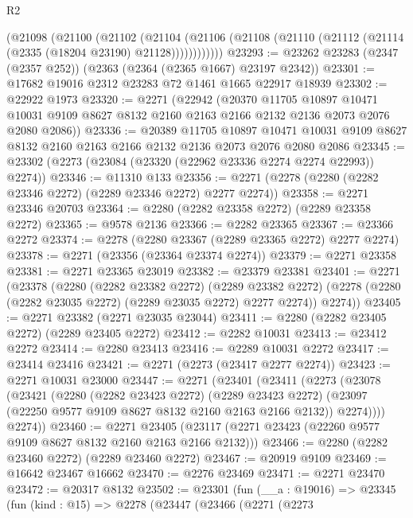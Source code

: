 \begin{lexlean}{R2}
\begin{coremodule}
        (@21098
          (@21100
            (@21102
              (@21104
                (@21106 (@21108 (@21110 (@21112 (@21114 (@2335 (@18204 @23190) @21128))))))))))))
@23293 := @23262 @23283 (@2347 (@2357 @252)) (@2363 (@2364 (@2365 @1667) @23197 @2342))
@23301 := @17682 @19016 @2312 @23283 @72 @1461 @1665 @22917 @18939
@23302 := @22922 @1973
@23320 := @2271
    (@22942
      (@20370
        @11705
        @10897
        @10471
        @10031
        @9109
        @8627
        @8132
        @2160
        @2163
        @2166
        @2132
        @2136
        @2073
        @2076
        @2080
        @2086))
@23336 := @20389
    @11705
    @10897
    @10471
    @10031
    @9109
    @8627
    @8132
    @2160
    @2163
    @2166
    @2132
    @2136
    @2073
    @2076
    @2080
    @2086
@23345 := @23302 (@2273 (@23084 (@23320 (@22962 @23336 @2274 @2274 @22993)) @2274))
@23346 := @11310 @133
@23356 := @2271 (@2278 (@2280 (@2282 @23346 @2272) (@2289 @23346 @2272) @2277 @2274))
@23358 := @2271 @23346 @20703
@23364 := @2280 (@2282 @23358 @2272) (@2289 @23358 @2272)
@23365 := @9578 @2136
@23366 := @2282 @23365
@23367 := @23366 @2272
@23374 := @2278 (@2280 @23367 (@2289 @23365 @2272) @2277 @2274)
@23378 := @2271 (@23356 (@23364 @23374 @2274))
@23379 := @2271 @23358
@23381 := @2271 @23365 @23019
@23382 := @23379 @23381
@23401 := @2271
    (@23378
      (@2280
        (@2282 @23382 @2272)
        (@2289 @23382 @2272)
        (@2278 (@2280 (@2282 @23035 @2272) (@2289 @23035 @2272) @2277 @2274))
        @2274))
@23405 := @2271 @23382 (@2271 @23035 @23044)
@23411 := @2280 (@2282 @23405 @2272) (@2289 @23405 @2272)
@23412 := @2282 @10031
@23413 := @23412 @2272
@23414 := @2280 @23413
@23416 := @2289 @10031 @2272
@23417 := @23414 @23416
@23421 := @2271 (@2273 (@23417 @2277 @2274))
@23423 := @2271 @10031 @23000
@23447 := @2271
    (@23401
      (@23411
        (@2273
          (@23078
            (@23421
              (@2280
                (@2282 @23423 @2272)
                (@2289 @23423 @2272)
                (@23097 (@22250 @9577 @9109 @8627 @8132 @2160 @2163 @2166 @2132))
                @2274))))
        @2274))
@23460 := @2271
    @23405
    (@23117 (@2271 @23423 (@22260 @9577 @9109 @8627 @8132 @2160 @2163 @2166 @2132)))
@23466 := @2280 (@2282 @23460 @2272) (@2289 @23460 @2272)
@23467 := @20919 @9109
@23469 := @16642 @23467 @16662
@23470 := @2276 @23469
@23471 := @2271 @23470
@23472 := @20317 @8132
@23502 := @23301
    (fun (__a : @19016) =>
    @23345
      (fun (kind : @15) =>
      @2278
        (@23447
          (@23466
            (@2271
              (@2273

\end{coremodule}
\end{lexlean}
